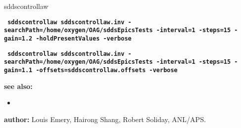\begin{sddsprog}{sddscontrollaw}
      \begin{flushleft}{\tt \bf
     sddscontrollaw sddscontrollaw.inv -searchPath=/home/oxygen/OAG/sddsEpicsTests  -interval=1 -steps=15 -gain=1.2 -holdPresentValues -verbose
      }\end{flushleft}

     \begin{flushleft}{\tt \bf
     sddscontrollaw sddscontrollaw.inv -searchPath=/home/oxygen/OAG/sddsEpicsTests  -interval=1 -steps=15 -gain=1.1 -offsets=sddscontrollaw.offsets -verbose
     }\end{flushleft}

\item \textbf{see also:}

\begin{itemize}
  \item {}
\end{itemize}
\item \textbf{author:} Louis Emery, Hairong Shang, Robert Soliday, ANL/APS.
\end{sddsprog}
